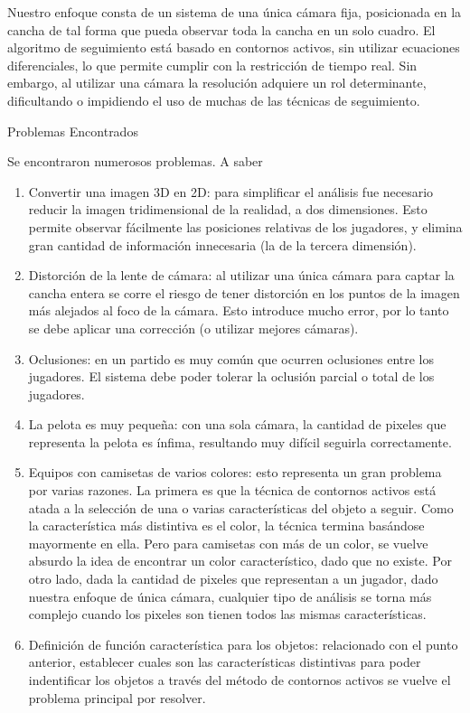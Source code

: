 \documentclass[a4paper,10pt]{article}
\begin{document}
Nuestro enfoque consta de un sistema de una única cámara fija, posicionada en la cancha de tal forma que pueda observar
toda la cancha en un solo cuadro. El algoritmo de seguimiento está basado en contornos activos, sin utilizar ecuaciones diferenciales, lo que permite cumplir
con la restricción de tiempo real. Sin embargo, al utilizar una cámara la resolución adquiere un rol determinante,
dificultando o impidiendo el uso de muchas de las técnicas de seguimiento.

Problemas Encontrados

Se encontraron numerosos problemas. A saber

\begin{enumerate}
    \item Convertir una imagen 3D en 2D: para simplificar el análisis fue necesario reducir la imagen tridimensional de la realidad, a
        dos dimensiones. Esto permite observar fácilmente las posiciones relativas de los jugadores, y elimina gran cantidad de información
        innecesaria (la de la tercera dimensión).
    \item Distorción de la lente de cámara: al utilizar una única cámara para captar la cancha entera se corre el riesgo de tener distorción
        en los puntos de la imagen más alejados al foco de la cámara. Esto introduce mucho error, por lo tanto se debe aplicar una corrección
        (o utilizar mejores cámaras).
    \item Oclusiones: en un partido es muy común que ocurren oclusiones entre los jugadores. El sistema debe poder tolerar la oclusión parcial o total
        de los jugadores.
    \item La pelota es muy pequeña: con una sola cámara, la cantidad de pixeles que representa la pelota es ínfima, resultando muy difícil seguirla
        correctamente.
    \item Equipos con camisetas de varios colores: esto representa un gran problema por varias razones. La primera es que la técnica de contornos activos
        está atada a la selección de una o varias características del objeto a seguir. Como la característica más distintiva es el color, la técnica termina
        basándose mayormente en ella. Pero para camisetas con más de un color, se vuelve absurdo la idea de encontrar un color característico,
        dado que no existe. Por otro lado, dada la cantidad de pixeles que representan a un jugador, dado nuestra enfoque de única cámara, cualquier
        tipo de análisis se torna más complejo cuando los pixeles son tienen todos las mismas características.
    \item Definición de función característica para los objetos: relacionado con el punto anterior, establecer cuales son las características distintivas para
        poder indentificar los objetos a través del método de contornos activos se vuelve el problema principal por resolver.
\end{enumerate}
\end{document}
